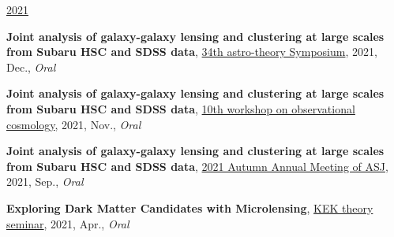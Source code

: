\underline{2021}
\begin{etaremune}
\setcounter{enumi}{20}
\item \textbf{Joint analysis of galaxy-galaxy lensing and clustering at large scales from Subaru HSC and SDSS data}, \href{https://sites.google.com/view/rironkon2021/}{34th astro-theory Symposium}, 2021, Dec., \textit{Oral}
\item \textbf{Joint analysis of galaxy-galaxy lensing and clustering at large scales from Subaru HSC and SDSS data}, \href{https://sites.google.com/view/obscosmws2021main}{10th workshop on observational cosmology}, 2021, Nov., \textit{Oral}
\item \textbf{Joint analysis of galaxy-galaxy lensing and clustering at large scales from Subaru HSC and SDSS data}, \href{https://www.asj.or.jp/nenkai/archive/2021b/pdf/U05a.pdf}{2021 Autumn Annual Meeting of ASJ}, 2021, Sep., \textit{Oral}
\item \textbf{Exploring Dark Matter Candidates with Microlensing}, \href{https://www.kek.jp/ja/conference/20210407-3/}{KEK theory seminar}, 2021, Apr., \textit{Oral}
\end{etaremune}


